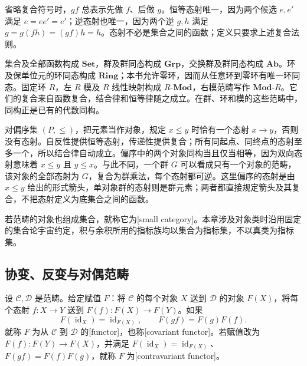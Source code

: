省略复合符号时，\(gf\) 总表示先做 \(f\)、后做 \(g\)。恒等态射唯一，因为两个候选 \(e,e'\) 满足 \(e=e e'=e'\)；逆态射也唯一，因为两个逆 \(g,h\) 满足 \(g=g(fh)=(gf)h=h\)。态射不必是集合之间的函数；定义只要求上述复合法则。

\ProseParagraphBreak
集合及全部函数构成 \(\mathbf{Set}\)，群及群同态构成 \(\mathbf{Grp}\)，交换群及群同态构成 \(\mathbf{Ab}\)。环及保单位元的环同态构成 \(\mathbf{Ring}\)；本书允许零环，因而从任意环到零环有唯一环同态。固定环 \(R\)，左 \(R\) 模及 \(R\) 线性映射构成 \(R\text{-}\mathbf{Mod}\)，右模范畴写作 \(\mathbf{Mod}\text{-}R\)。它们的复合来自函数复合，结合律和恒等律随之成立。在群、环和模的这些范畴中，同构正是已有的代数同构。

对偏序集 \((P,\le)\)，把元素当作对象，规定 \(x\le y\) 时恰有一个态射 \(x\rightarrow y\)，否则没有态射。自反性提供恒等态射，传递性提供复合；所有同起点、同终点的态射至多一个，所以结合律自动成立。偏序中的两个对象同构当且仅当相等，因为双向态射意味着 \(x\le y\) 且 \(y\le x\)。与此不同，一个群 \(G\) 可以看成只有一个对象的范畴，该对象的全部态射为 \(G\)，复合为群乘法，每个态射都可逆。这里偏序的态射是由 \(x\le y\) 给出的形式箭头，单对象群的态射则是群元素；两者都直接规定箭头及其复合，不把态射定义为底集合之间的函数。

\ProseParagraphBreak
若范畴的对象也组成集合，就称它为[small category]。本章涉及对象类时沿用固定的集合论宇宙约定，积与余积所用的指标族均以集合为指标集，不以真类为指标集。

\subsection{协变、反变与对偶范畴}
\label{b2:subsec:0501:02}

\begin{definition}\label{b2:def:functor}
	设 \(\mathcal C,\mathcal D\) 是范畴。给定赋值 \(F\)：将 \(\mathcal C\) 的每个对象 \(X\) 送到 \(\mathcal D\) 的对象 \(F(X)\)，将每个态射 \(f:X\rightarrow Y\) 送到 \(F(f):F(X)\rightarrow F(Y)\)。如果
	\[
		F(\operatorname{id}_X)=\operatorname{id}_{F(X)},\qquad F(gf)=F(g)F(f).
	\]
	就称 \(F\) 为从 \(\mathcal C\) 到 \(\mathcal D\) 的[functor]，也称[covariant functor]。若赋值改为 \(F(f):F(Y)\rightarrow F(X)\)，并满足 \(F(\operatorname{id}_X)=\operatorname{id}_{F(X)}\)、\(F(gf)=F(f)F(g)\)，就称 \(F\) 为[contravariant functor]。
\end{definition}


